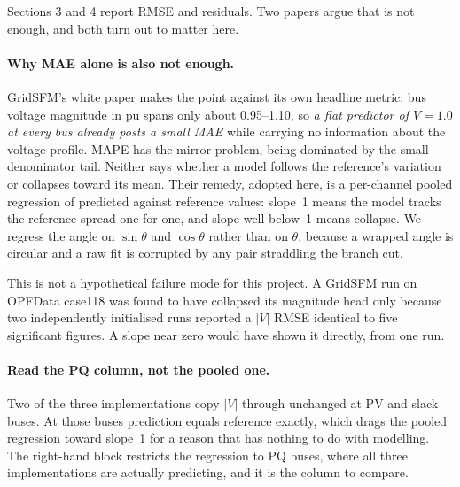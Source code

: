 \documentclass[10pt]{article}
\begin{document}
Sections 3 and 4 report RMSE and residuals. Two papers argue that is not enough,
and both turn out to matter here.

\paragraph{Why MAE alone is also not enough.} GridSFM's white paper makes the
point against its own headline metric: bus voltage magnitude in pu spans only
about 0.95--1.10, so \emph{a flat predictor of $V = 1.0$ at every bus already
posts a small MAE} while carrying no information about the voltage profile.
MAPE has the mirror problem, being dominated by the small-denominator tail.
Neither says whether a model follows the reference's variation or collapses
toward its mean. Their remedy, adopted here, is a per-channel pooled regression
of predicted against reference values: slope~1 means the model tracks the
reference spread one-for-one, and slope well below~1 means collapse. We regress
the angle on $\sin\theta$ and $\cos\theta$ rather than on $\theta$, because a
wrapped angle is circular and a raw fit is corrupted by any pair straddling the
branch cut.

This is not a hypothetical failure mode for this project. A GridSFM run on
OPFData case118 was found to have collapsed its magnitude head only because two
independently initialised runs reported a $|V|$ RMSE identical to five
significant figures. A slope near zero would have shown it directly, from one
run.

\paragraph{Read the PQ column, not the pooled one.} Two of the three
implementations copy $|V|$ through unchanged at PV and slack buses. At those
buses prediction equals reference exactly, which drags the pooled regression
toward slope~1 for a reason that has nothing to do with modelling. The
right-hand block restricts the regression to PQ buses, where all three
implementations are actually predicting, and it is the column to compare.
\end{document}
